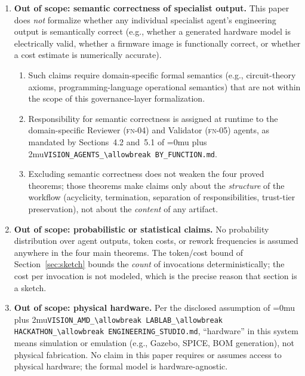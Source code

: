 \documentclass[12pt]{article}
\theoremstyle{definition}
\DeclareRobustCommand{\code}[1]{\begingroup\Urlmuskip=0mu plus 2mu\relax\nolinkurl{#1}\endgroup}
\newcommand{\FN}[1]{\textsc{fn-#1}}
\newcommand{\VisionFunc}{\code{VISION\_AGENTS\_\allowbreak BY\_FUNCTION.md}}
\newcommand{\VisionHackathon}{\code{VISION\_AMD\_\allowbreak LABLAB\_\allowbreak HACKATHON\_\allowbreak ENGINEERING\_STUDIO.md}}
\begin{document}
\begin{enumerate}
    \item \textbf{Out of scope: semantic correctness of specialist
          output.}
          This paper does \emph{not} formalize whether any individual
          specialist agent's engineering output is semantically correct
          (e.g., whether a generated hardware model is electrically valid,
          whether a firmware image is functionally correct, or whether a
          cost estimate is numerically accurate).
          \begin{enumerate}
              \item[E1.] Such claims require domain-specific formal
                         semantics (e.g., circuit-theory axioms,
                         programming-language operational semantics)
                         that are not within the scope of this
                         governance-layer formalization.
              \item[E2.] Responsibility for semantic correctness is
                         assigned at runtime to the domain-specific
                         Reviewer (\FN{04}) and Validator (\FN{05})
                         agents, as mandated by Sections~4.2 and~5.1
                         of \VisionFunc{}.
              \item[E3.] Excluding semantic correctness does not weaken
                         the four proved theorems; those theorems make
                         claims only about the \emph{structure} of the
                         workflow (acyclicity, termination, separation of
                         responsibilities, trust-tier preservation), not
                         about the \emph{content} of any artifact.
          \end{enumerate}

    \item \textbf{Out of scope: probabilistic or statistical claims.}
          No probability distribution over agent outputs, token costs,
          or rework frequencies is assumed anywhere in the four main
          theorems.
          The token/cost bound of Section~\ref{sec:sketch} bounds the
          \emph{count} of invocations deterministically; the cost per
          invocation is not modeled, which is the precise reason that
          section is a sketch.

    \item \textbf{Out of scope: physical hardware.}
          Per the disclosed assumption of \VisionHackathon{},
          ``hardware'' in this system means simulation or emulation
          (e.g., Gazebo, SPICE, BOM generation), not physical
          fabrication.
          No claim in this paper requires or assumes access to
          physical hardware; the formal model is hardware-agnostic.


\end{enumerate}
\end{document}

